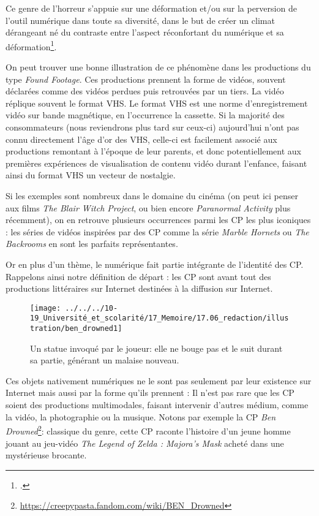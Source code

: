\documentclass[12pt,a4paper,oneside,titlepage]{article} %
\begin{document}
Ce genre de l’horreur s’appuie sur une déformation et/ou sur la perversion de l’outil numérique dans toute sa diversité, dans le but de créer un climat dérangeant né du contraste entre l’aspect réconfortant du numérique et sa déformation\footcite{balanzategui_creepypasta_2019}. 
\par
On peut trouver une bonne illustration de ce phénomène dans les productions du type \textit{Found Footage}. Ces productions prennent la forme de vidéos, souvent déclarées comme des vidéos perdues puis retrouvées par un tiers. La vidéo réplique souvent le format VHS. Le format VHS est une norme d'enregistrement vidéo sur bande magnétique, en l'occurrence la cassette. Si la majorité des consommateurs (nous reviendrons plus tard sur ceux-ci) aujourd'hui n'ont pas connu directement l'âge d'or des VHS, celle-ci est facilement associé aux productions remontant à l'époque de leur parents, et donc potentiellement aux premières expériences de visualisation de contenu vidéo durant l'enfance, faisant ainsi du format VHS un vecteur de nostalgie.


Si les exemples sont nombreux dans le domaine du cinéma (on peut ici penser aux films \emph{The Blair Witch Project}, ou bien encore \emph{Paranormal Activity} plus récemment), on en retrouve plusieurs occurrences parmi les CP les plus iconiques : les séries de vidéos inspirées par des CP comme la série \emph{Marble Hornets} ou\emph{ The Backrooms} en sont les parfaits représentantes.

Or en plus d’un thème, le numérique fait partie intégrante de l’identité des CP. Rappelons ainsi notre définition de départ : les CP sont avant tout des productions littéraires sur Internet destinées à la diffusion sur Internet. 
	\begin{wrapfigure}{r}{5cm}
	\centering
	\texttt{[image: ../../../10-19\_Université\_et\_scolarité/17\_Memoire/17.06\_redaction/illustration/ben\_drowned1]}
	\caption{\small Un statue invoqué par le joueur: elle ne bouge pas et le suit durant sa partie, générant un malaise nouveau.}
\end{wrapfigure}

Ces objets nativement numériques ne le sont pas seulement par leur existence sur Internet mais aussi par la forme qu’ils prennent : Il n’est pas rare que les CP soient des productions multimodales, faisant intervenir d’autres médium, comme la vidéo, la photographie ou la musique. Notons par exemple la CP \emph{Ben Drowned}\footnote{\url{https://creepypasta.fandom.com/wiki/BEN_Drowned}}: classique du genre, cette CP raconte l’histoire d’un jeune homme jouant au jeu-vidéo \emph{The Legend of Zelda : Majora's Mask} acheté dans une mystérieuse brocante. \\
\end{document}
